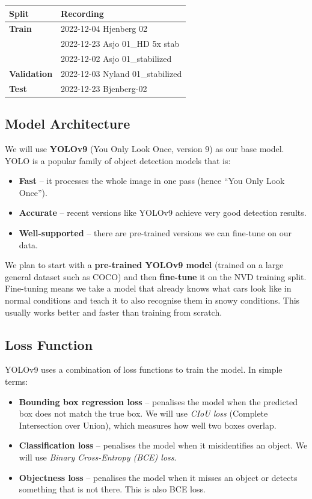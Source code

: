\begin{center}
\begin{tabular}{>{\bfseries}ll}
\toprule
Split & Recording \\
\midrule
Train      & 2022-12-04 Hjenberg 02 \\
           & 2022-12-23 Asjo 01\_HD 5x stab \\
           & 2022-12-02 Asjo 01\_stabilized \\
Validation & 2022-12-03 Nyland 01\_stabilized \\
Test       & 2022-12-23 Bjenberg-02 \\
\bottomrule
\end{tabular}
\end{center}
 
\subsection{Model Architecture}
 
We will use \textbf{YOLOv9} (You Only Look Once, version 9) as our base model.
YOLO is a popular family of object detection models that is:
\begin{itemize}
    \item \textbf{Fast} -- it processes the whole image in one pass (hence ``You Only Look Once'').
    \item \textbf{Accurate} -- recent versions like YOLOv9 achieve very good detection results.
    \item \textbf{Well-supported} -- there are pre-trained versions we can fine-tune on our data.
\end{itemize}
 
We plan to start with a \textbf{pre-trained YOLOv9 model} (trained on a large general dataset
such as COCO) and then \textbf{fine-tune} it on the NVD training split. Fine-tuning means
we take a model that already knows what cars look like in normal conditions and teach it
to also recognise them in snowy conditions. This usually works better and faster than
training from scratch.
 
\subsection{Loss Function}
 
YOLOv9 uses a combination of loss functions to train the model. In simple terms:
 
\begin{itemize}
    \item \textbf{Bounding box regression loss} -- penalises the model when the predicted box
          does not match the true box. We will use \textit{CIoU loss} (Complete Intersection
          over Union), which measures how well two boxes overlap.
    \item \textbf{Classification loss} -- penalises the model when it misidentifies an object.
          We will use \textit{Binary Cross-Entropy (BCE) loss}.
    \item \textbf{Objectness loss} -- penalises the model when it misses an object or detects
          something that is not there. This is also BCE loss.
\end{itemize}
 
